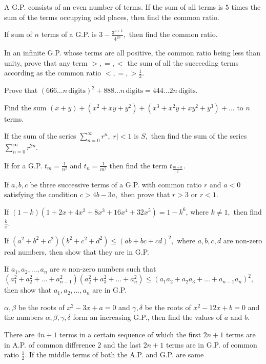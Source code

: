 \item A G.P. consists of an even number of terms. If the sum of all terms is $5$ times the sum of the terms occupying odd
  places, then find the common ratio.
\item If sum of $n$ terms of a G.P. is $3 - \frac{3^{n + 1}}{4^{2n}},$ then find the common ratio.
\item In an infinite G.P. whose terms are all positive, the common ratio being less than unity, prove that any term $>, =,
  <$ the sum of all the succeeding terms according as the common ratio $<, =, > \frac{1}{2}$.
\item Prove that $(666\ldots n\,\text{digits})^2 + 888\ldots n\,\text{digits} = 444\ldots 2n\,\text{digits}$.
\item Find the sum $(x + y) + (x^2 + xy + y^2) + (x^3 + x^2y + xy^2 + y^3) + \ldots$ to $n$ terms.
\item If the sum of the series $\displaystyle\sum_{n = 0}^\infty r^n, |r| < 1$ is $S,$ then find the sum of the series $\displaystyle\sum_{n=0}^\infty
  r^{2n}$.
\item If for a G.P. $t_m = \frac{1}{n^2}$ and $t_n = \frac{1}{m^2}$ then find the term $t_{\tfrac{m + n}{2}}$.
\item If $a, b, c$ be three successive terms of a G.P. with common ratio $r$ and $a < 0$ satisfying the condition $c > 4b
  - 3a,$ then prove that $r > 3$ or $r < 1$.
\item If $(1 - k)(1 + 2x + 4x^2 + 8x^3 + 16x^4 + 32x^5) = 1 - k^6$, where $k \neq 1,$ then find $\frac{k}{x}$.
\item If $(a^2 + b^2 + c^2)(b^2 + c^2 + d^2) \leq (ab + bc + cd)^2,$ where $a, b, c, d$ are non-zero real numbers, then
  show that they are in G.P.
\item If $a_1, a_2, \ldots, a_n$ are $n$ non-zero numbers such that $(a_1^2 + a_2^2 + \ldots + a_{n - 1}^2)(a_2^2 + a_3^2
  + \ldots + a_n^2) \leq (a_1a_2 + a_2a_3 + \ldots + a_{n - 1}a_n)^2,$ then show that $a_1, a_2, \ldots, a_n$ are in G.P.
\item $\alpha, \beta$ be the roots of $x^2 - 3x + a = 0$ and $\gamma, \delta$ be the roots of $x^2 - 12x + b = 0$ and the
  numbers $\alpha, \beta, \gamma, \delta$ form an increasing G.P., then find the values of $a$ and $b$.
\item There are $4n + 1$ terms in a certain sequence of which the first $2n + 1$ terms are in A.P. of common difference
  $2$ and the last $2n + 1$ terms are in G.P. of common ratio $\frac{1}{2}.$ If the middle terms of both the A.P. and G.P. are same
